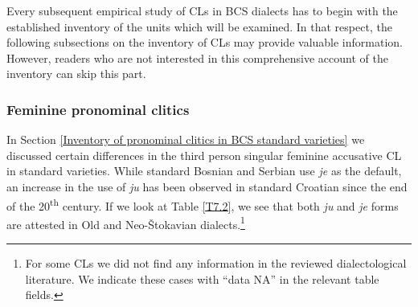 Every subsequent empirical study of CLs in BCS dialects has to begin with the established inventory of the units which will be examined. In that respect, the following subsections on the inventory of CLs may provide valuable information. However, readers who are not interested in this comprehensive account of the inventory can skip this part.

\subsubsection{Feminine pronominal clitics}
\label{Feminine pronominal clitics}




In Section \ref{Inventory of pronominal clitics in BCS standard varieties} we discussed certain differences in the third person singular feminine accusative CL in standard varieties. While standard Bosnian and Serbian use \textit{je} as the default, an increase in the use of \textit{ju} has been observed in standard Croatian since the end of the 20\textsuperscript{th} century. If we look at Table \ref{T7.2}, we see that both \textit{ju} and \textit{je} forms are attested in Old and Neo-Štokavian dialects.\footnote{For some CLs we did not find any information in the reviewed dialectological literature. We indicate these cases with “data NA” in the relevant table fields.} 

\begin{table}[t]
\caption{CL forms of the third person singular feminine pronoun\label{T7.2}}
\end{table}

